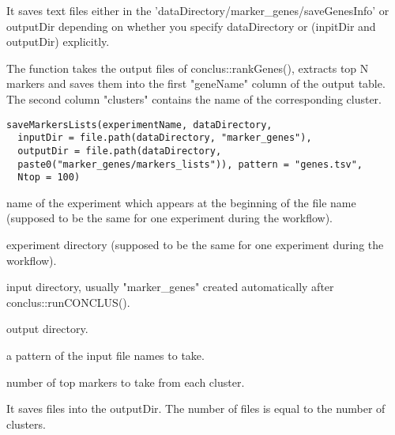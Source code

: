 \documentclass[a4paper]{book}
\begin{document}
%
\begin{Value}
It saves text files either in the 'dataDirectory/marker\_genes/saveGenesInfo' or outputDir 
depending on whether you specify dataDirectory or (inpitDir and outputDir) explicitly.
\end{Value}
%
\begin{Description}\relax
The function takes the output files of conclus::rankGenes(), extracts top N markers and saves
them into the first "geneName" column of the output table. The second column "clusters" contains the 
name of the corresponding cluster.
\end{Description}
%
\begin{Usage}
\begin{verbatim}
saveMarkersLists(experimentName, dataDirectory,
  inputDir = file.path(dataDirectory, "marker_genes"),
  outputDir = file.path(dataDirectory,
  paste0("marker_genes/markers_lists")), pattern = "genes.tsv",
  Ntop = 100)
\end{verbatim}
\end{Usage}
%
\begin{Arguments}
\begin{ldescription}
\item[\code{experimentName}] name of the experiment which appears at the beginning of the file name 
(supposed to be the same for one experiment during the workflow).

\item[\code{dataDirectory}] experiment directory (supposed to be the same for one experiment during the workflow).

\item[\code{inputDir}] input directory, usually "marker\_genes" created automatically after conclus::runCONCLUS().

\item[\code{outputDir}] output directory.

\item[\code{pattern}] a pattern of the input file names to take.

\item[\code{Ntop}] number of top markers to take from each cluster.
\end{ldescription}
\end{Arguments}
%
\begin{Value}
It saves files into the outputDir. The number of files is equal to the number of clusters.
\end{Value}
\end{document}
